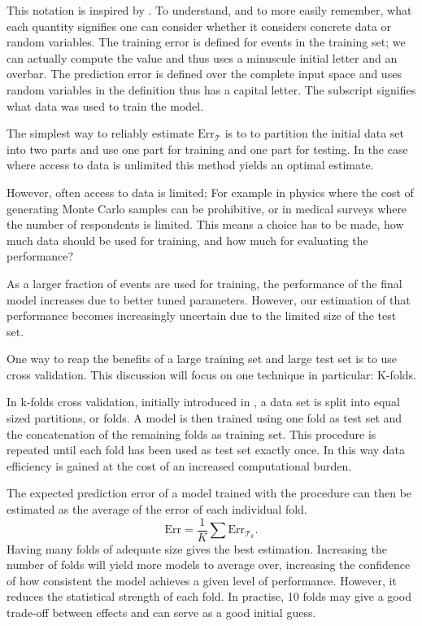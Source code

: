 This notation is inspired by \cite{Hastie01a}. To understand, and to more easily remember, what each quantity signifies one can consider whether it considers concrete data or random variables. The training error is defined for events in the training set; we can actually compute the value and thus uses a minuscule initial letter and an overbar.  The prediction error is defined over the complete input space and uses random variables in the definition thus has a capital letter.
The subscript signifies what data was used to train the model.

The simplest way to reliably estimate $\text{Err}_{\mathcal{T}}$ is to to partition the initial data set into two parts and use one part for training and one part for testing. In the case where access to data is unlimited this method yields an optimal estimate.

However, often access to data is limited; For example in physics where the cost of generating Monte Carlo samples can be prohibitive, or in medical surveys where the number of respondents is limited. This means a choice has to be made, how much data should be used for training, and how much for evaluating the performance?

As a larger fraction of events are used for training, the performance of the final model increases due to better tuned parameters. However, our estimation of that performance becomes increasingly uncertain due to the limited size of the test set.

One way to reap the benefits of a large training set and large test set is to use cross validation. This discussion will focus on one technique in particular: K-folds.

In k-folds cross validation, initially introduced in \cite{Geisser75}, a data set is split into equal sized partitions, or folds. A model is then trained using one fold as test set and the concatenation of the remaining folds as training set. This procedure is repeated until each fold has been used as test set exactly once. In this way data efficiency is gained at the cost of an increased computational burden.

The expected prediction error of a model trained with the procedure can then be estimated as the average of the error of each individual fold.
\begin{equation}
   \text{Err} = \frac{1}{K} \sum \text{Err}_{\mathcal{T}_k}.
\end{equation}
Having many folds of adequate size gives the best estimation. Increasing the number of folds will yield more models to average over, increasing the confidence of how consistent the model achieves a given level of performance. However, it reduces the statistical strength of each fold. In practise, 10 folds may give a good trade-off between effects and can serve as a good initial guess.

